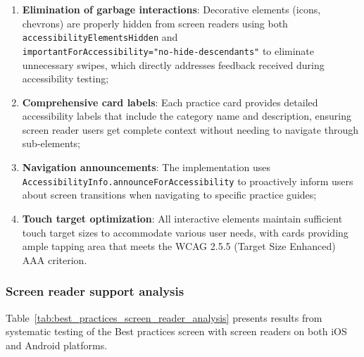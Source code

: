 \begin{enumerate}
    \item \textbf{Elimination of garbage interactions}: Decorative elements (icons, chevrons) are properly hidden from screen readers using both \texttt{accessibilityElementsHidden} and \\ \texttt{importantForAccessibility="no-hide-descendants"} to eliminate unnecessary swipes, which directly addresses feedback received during accessibility testing;
    
    \item \textbf{Comprehensive card labels}: Each practice card provides detailed accessibility labels that include the category name and description, ensuring screen reader users get complete context without needing to navigate through sub-elements;
    
    \item \textbf{Navigation announcements}: The implementation uses \\ \texttt{AccessibilityInfo.announceForAccessibility} to proactively inform users about screen transitions when navigating to specific practice guides;
    
    \item \textbf{Touch target optimization}: All interactive elements maintain sufficient touch target sizes to accommodate various user needs, with cards providing ample tapping area that meets the WCAG 2.5.5 (Target Size Enhanced) AAA criterion.
\end{enumerate}

\subsubsection{Screen reader support analysis}

Table~\ref{tab:best_practices_screen_reader_analysis} presents results from systematic testing of the Best practices screen with screen readers on both iOS and Android platforms.

